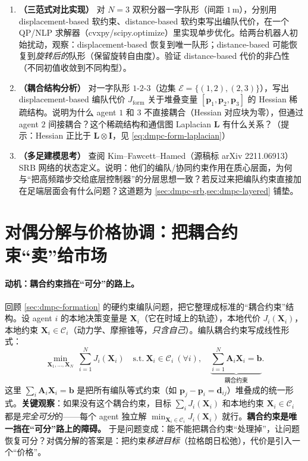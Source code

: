 \begin{exercise}
\begin{enumerate}
  \item \textbf{（三范式对比实现）} 对 $N=3$ 双积分器一字队形（间距 $1$\,m），分别用 displacement-based 软约束、distance-based 软约束写出编队代价，在一个 QP/NLP 求解器（cvxpy/scipy.optimize）里实现单步优化。给两台机器人初始扰动，观察：displacement-based 恢复到唯一队形；distance-based 可能恢复到\emph{旋转后的}队形（保留旋转自由度）。验证 distance-based 代价的非凸性（不同初值收敛到不同构型）。
  \item \textbf{（耦合结构分析）} 对一字队形 $1$-$2$-$3$（边集 $\mathcal{E}=\{(1,2),(2,3)\}$），写出 displacement-based 编队代价 $J_{\text{form}}$ 关于堆叠变量 $[\mathbf{p}_1,\mathbf{p}_2,\mathbf{p}_3]$ 的 Hessian 稀疏结构。说明为什么 agent $1$ 和 $3$ 不直接耦合（Hessian 对应块为零），但通过 agent $2$ 间接耦合？这个稀疏结构和通信图 Laplacian $\mathbf{L}$ 有什么关系？（提示：Hessian 正比于 $\mathbf{L}\otimes \mathbf{I}$，见 \cref{eq:dmpc-form-laplacian}）
  \item \textbf{（多足建模思考）} 查阅 Kim--Fawcett--Hamed\cite{kim2023layered}（源稿标 arXiv 2211.06913）SRB 网络的状态定义。说明：他们的编队/协同约束作用在质心层面，为何与“把高频踏步交给底层控制器”的分层思想一致？若反过来把编队约束直接加在足端层面会有什么问题？这道题为 \cref{sec:dmpc-srb,sec:dmpc-layered} 铺垫。
\end{enumerate}
\end{exercise}

\section{对偶分解与价格协调：把耦合约束“卖”给市场}
\label{sec:dmpc-dual}

\paragraph{动机：耦合约束挡在“可分”的路上。}
回顾 \cref{sec:dmpc-formation} 的硬约束编队问题，把它整理成标准的“耦合约束”结构。设 agent $i$ 的本地决策变量是 $\mathbf{X}_i$（它在时域上的轨迹），本地代价 $J_i(\mathbf{X}_i)$，本地约束 $\mathbf{X}_i\in\mathcal{C}_i$（动力学、摩擦锥等，\emph{只含自己}）。编队耦合约束写成线性形式：
\begin{equation}
  \min_{\mathbf{X}_1,\dots,\mathbf{X}_N}\ \sum_{i=1}^N J_i(\mathbf{X}_i)\quad \text{s.t.}\ \mathbf{X}_i\in\mathcal{C}_i\ (\forall i),\quad \underbrace{\sum_{i=1}^N \mathbf{A}_i\mathbf{X}_i = \mathbf{b}}_{\text{耦合约束}}.
  \label{eq:dmpc-coupled}
\end{equation}
这里 $\sum_i \mathbf{A}_i\mathbf{X}_i=\mathbf{b}$ 是把所有编队等式约束（如 $\mathbf{p}_j-\mathbf{p}_i=\mathbf{d}_{ij}$）堆叠成的统一形式。\textbf{关键观察}：如果没有这个耦合约束，目标 $\sum_i J_i(\mathbf{X}_i)$ 和本地约束 $\mathbf{X}_i\in\mathcal{C}_i$ 都是\emph{完全可分}的——每个 agent 独立解 $\min_{\mathbf{X}_i\in\mathcal{C}_i}J_i(\mathbf{X}_i)$ 就行。\textbf{耦合约束是唯一挡在“可分”路上的障碍。} 于是问题变成：能不能把耦合约束“处理掉”，让问题恢复可分？对偶分解的答案是：把约束\emph{移进目标}（拉格朗日松弛），代价是引入一个“价格”。

